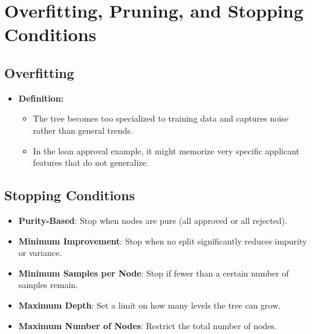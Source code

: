 \documentclass[10pt]{article}
\begin{document}
\section{Overfitting, Pruning, and Stopping Conditions}

\subsection{Overfitting}
\begin{itemize}
    \item \textbf{Definition:}
    \begin{itemize}
        \item The tree becomes too specialized to training data and captures noise rather than general trends.
        \item In the loan approval example, it might memorize very specific applicant features that do not generalize.
    \end{itemize}
\end{itemize}

\subsection{Stopping Conditions}
\begin{itemize}
    \item \textbf{Purity-Based}: Stop when nodes are pure (all approved or all rejected).
    \item \textbf{Minimum Improvement}: Stop when no split significantly reduces impurity or variance.
    \item \textbf{Minimum Samples per Node}: Stop if fewer than a certain number of samples remain.
    \item \textbf{Maximum Depth}: Set a limit on how many levels the tree can grow.
    \item \textbf{Maximum Number of Nodes}: Restrict the total number of nodes.
\end{itemize}
\end{document}
